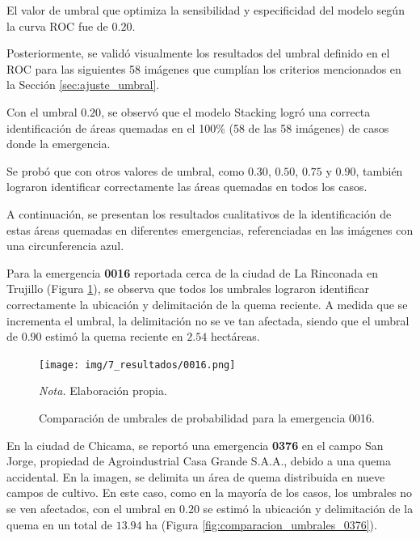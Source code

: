 El valor de umbral que optimiza la sensibilidad y especificidad del modelo según la curva ROC fue de 
$0.20$.

Posteriormente, se validó visualmente los resultados del umbral definido en el ROC para las siguientes 
58 imágenes que cumplían los criterios mencionados en la Sección \ref{sec:ajuste_umbral}.

Con el umbral $0.20$, se observó que el modelo Stacking logró una correcta identificación de áreas quemadas en 
el 100\% (58 de las 58 imágenes) de casos donde la emergencia. 

Se probó que con otros valores de umbral, como $0.30$, $0.50$, $0.75$ y $0.90$, también lograron identificar
correctamente las áreas quemadas en todos los casos. 

A continuación, se presentan los resultados cualitativos
de la identificación de estas áreas quemadas en diferentes emergencias, referenciadas en las imágenes con una circunferencia azul.

Para la emergencia \textbf{0016} reportada cerca de la ciudad de La Rinconada en Trujillo (Figura \ref{fig:comparacion_umbrales}),
se observa que todos los umbrales lograron identificar correctamente la ubicación y delimitación de la quema reciente. A medida que se incrementa 
el umbral, la delimitación no se ve tan afectada, siendo que el umbral de $0.90$ estimó la quema reciente en $2.54$ hectáreas.

\begin{figure}[H]
    \centering
    \caption{Comparación de umbrales de probabilidad para la emergencia 0016.}
    \label{fig:comparacion_umbrales}
    \texttt{[image: img/7\_resultados/0016.png]}
    \begin{flushleft}
        \vspace{-\baselineskip}
        \textit{Nota.} Elaboración propia.
        \vspace{-\baselineskip}
    \end{flushleft}
\end{figure}

En la ciudad de Chicama, se reportó una emergencia \textbf{0376} en el campo San Jorge, propiedad de Agroindustrial Casa Grande S.A.A., debido a una quema accidental. 
En la imagen, se delimita un área de quema distribuida en nueve campos de cultivo. En este caso, como en la mayoría de los casos, 
los umbrales no se ven afectados, con el umbral en $0.20$ se estimó la ubicación y delimitación de la quema en un total de $13.94$ ha (Figura \ref{fig:comparacion_umbrales_0376}).

